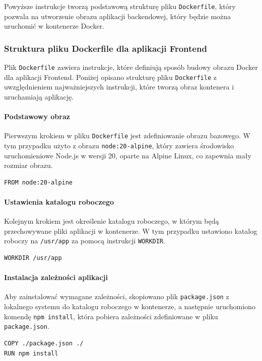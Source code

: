 Powyższe instrukcje tworzą podstawową strukturę pliku \texttt{Dockerfile}, który pozwala na utworzenie obrazu aplikacji backendowej, który będzie można uruchomić w kontenerze Docker.

\subsubsection{Struktura pliku Dockerfile dla aplikacji Frontend}

Plik \texttt{Dockerfile} zawiera instrukcje, które definiują sposób budowy obrazu Docker dla aplikacji Frontend. Poniżej opisano strukturę pliku \texttt{Dockerfile} z uwzględnieniem najważniejszych instrukcji, które tworzą obraz kontenera i uruchamiają aplikację.

\paragraph{Podstawowy obraz}
Pierwszym krokiem w pliku \texttt{Dockerfile} jest zdefiniowanie obrazu bazowego. W tym przypadku użyto z obrazu \texttt{node:20-alpine}, który zawiera środowisko uruchomieniowe Node.js w wersji 20, oparte na Alpine Linux, co zapewnia mały rozmiar obrazu.
\begin{lstlisting}
FROM node:20-alpine
\end{lstlisting}

\paragraph{Ustawienia katalogu roboczego}
Kolejnym krokiem jest określenie katalogu roboczego, w którym będą przechowywane pliki aplikacji w kontenerze. W tym przypadku ustawiono katalog roboczy na \texttt{/usr/app} za pomocą instrukcji \texttt{WORKDIR}.
\begin{lstlisting}
WORKDIR /usr/app
\end{lstlisting}

\paragraph{Instalacja zależności aplikacji}
Aby zainstalować wymagane zależności, skopiowano plik \texttt{package.json} z lokalnego systemu do katalogu roboczego w kontenerze, a następnie uruchomiono komendę \texttt{npm install}, która pobiera zależności zdefiniowane w pliku \texttt{package.json}.
\begin{lstlisting}
COPY ./package.json ./
RUN npm install
\end{lstlisting}

